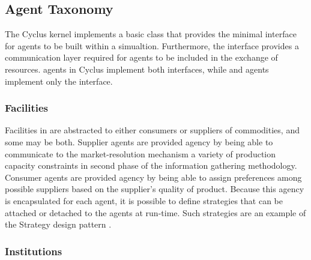 \subsection{Agent Taxonomy}

The Cyclus kernel implements a basic  class that provides the
minimal interface for agents to be built within a simualtion. Furthermore, the
 interface provides a communication layer required for agents to be
included in the exchange of resources.  agents in Cyclus
implement both interfaces, while  and  agents
implement only the  interface.

\subsubsection{Facilities}

Facilities in \Cyclus are abstracted to either consumers or suppliers of
commodities, and some may be both. Supplier agents are provided agency by being
able to communicate to the market-resolution mechanism a variety of production
capacity constraints in second phase of the information gathering
methodology. Consumer agents are provided agency by being able to assign
preferences among possible suppliers based on the supplier's quality of
product. Because this agency is encapsulated for each agent, it is possible to
define strategies that can be attached or detached to the agents at
run-time. Such strategies are an example of the Strategy design pattern
\cite{vlissides_design_1995}.

\subsubsection{Institutions}

